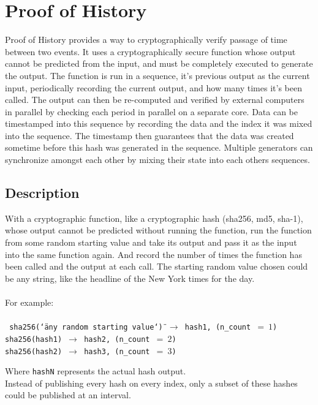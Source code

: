 \documentclass[12pt]{article}
\begin{document}
\section{Proof of History}\label{proof_of_history}

Proof of History provides a way to cryptographically verify passage of time between two events. It uses a cryptographically secure function whose output cannot be predicted from the input, and must be completely executed to generate the output. The function is run in a sequence, it’s previous output as the current input, periodically recording the current output, and how many times it’s been called. The output can then be re-computed and verified by external computers in parallel by checking each period in parallel on a separate core. Data can be timestamped into this sequence by recording the data and the index it was mixed into the sequence. The timestamp then guarantees that the data was created sometime before this hash was generated in the sequence. Multiple generators can synchronize amongst each other by mixing their state into each others sequences. \\

\subsection{Description}
With a cryptographic function, like a cryptographic hash (sha256, md5, sha-1), whose output cannot be predicted without running the function, run the function from some random starting value and take its output and pass it as the input into the same function again.  And record the number of times the function has been called and the output at each call.  The starting random value chosen could be any string, like the headline of the New York times for the day.
\\\\
\noindent For example: \\\\\noindent
\texttt{
  sha256(\char`\"any random starting value\char`\") $\rightarrow$
  hash1, (n\_count~$=~1$) \\
  sha256(hash1) $\rightarrow$ hash2, (n\_count~$=~2$)\\
  sha256(hash2) $\rightarrow$ hash3, (n\_count~$=~3$)\\
}

\noindent Where \texttt{hashN} represents the actual hash output. \\

Instead of publishing every hash on every index, only a subset of
these hashes could be published at an interval.\\
\end{document}
